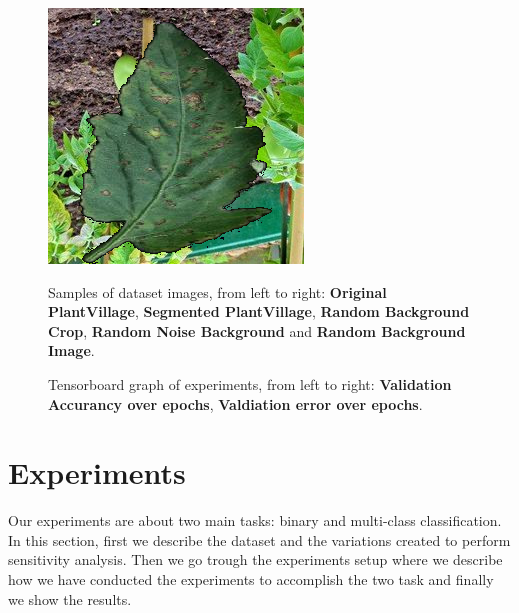 \begin{figure}
\begin{center}
{	   \includegraphics[scale=0.2241]{./images/random_backgorund}
	   }
	\begin{center}
		\caption{Samples of dataset images, from left to right: \textbf{Original PlantVillage}, \textbf{Segmented PlantVillage}, \textbf{Random Background Crop}, \textbf{Random Noise Background} and \textbf{Random Background Image}.}
		\label{fig:samples}
	\end{center}
	\vspace{-32pt}
\end{center}
\end{figure}
\begin{figure}
	\begin{center}
		\begin{center}
			\caption{Tensorboard graph of experiments, from left to right: \textbf{Validation Accurancy over epochs}, \textbf{Valdiation error over epochs}. }
			\label{fig:tensorboard}
		\end{center}
		\vspace{-15pt}
	\end{center}
\end{figure}
\section{Experiments}
Our experiments are about two main tasks: binary and multi-class classification. In this section, first we describe the dataset and the variations created to perform sensitivity analysis. Then we go trough the experiments setup where we describe how we have conducted the experiments to accomplish the two task and finally we show the results.
